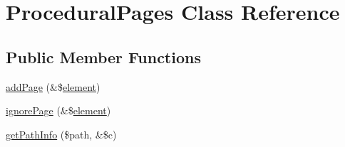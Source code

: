 \hypertarget{class_procedural_pages}{\section{\-Procedural\-Pages \-Class \-Reference}
\label{class_procedural_pages}
}
\subsection*{\-Public \-Member \-Functions}
\begin{DoxyCompactItemize}
\item 
\hyperlink{class_procedural_pages_aaeaaa9267ea690dfcaf7eb6b80cb9a94}{add\-Page} (\&\$\hyperlink{bug-904820_8php_aa94081298ab2dfd0f261cce6c203d9aa}{element})
\item 
\hyperlink{class_procedural_pages_abf3350e9945324342e85c412a1c4e91d}{ignore\-Page} (\&\$\hyperlink{bug-904820_8php_aa94081298ab2dfd0f261cce6c203d9aa}{element})
\item 
\hyperlink{class_procedural_pages_aca1dd3d0890a8494ce662272c5606992}{get\-Path\-Info} (\$path, \&\$c)
\end{DoxyCompactItemize}
